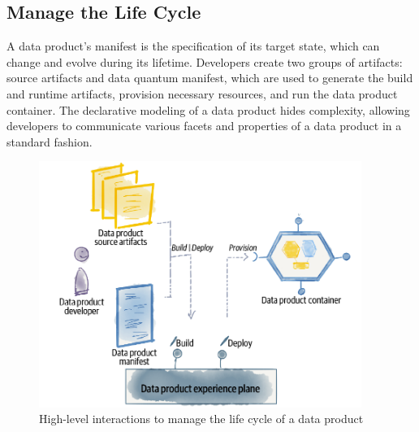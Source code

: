 \documentclass[12pt, a4paper]{book}
\begin{document}
\subsection{Manage the Life Cycle}
A data product's manifest is the specification of its target state, which can change and evolve during its lifetime. Developers create two groups of artifacts: source artifacts and data quantum manifest, which are used to generate the build and runtime artifacts, provision necessary resources, and run the data product container. The declarative modeling of a data product hides complexity, allowing developers to communicate various facets and properties of a data product in a standard fashion.

\begin{figure}
	\begin{framed}
		\centering
		\includegraphics[width=10.5cm]{ManageLifeCycle.png}
		\caption{High-level interactions to manage the life cycle of a data product}
		\label{ManageLifeCycle}
	\end{framed}
\end{figure}
\end{document}

